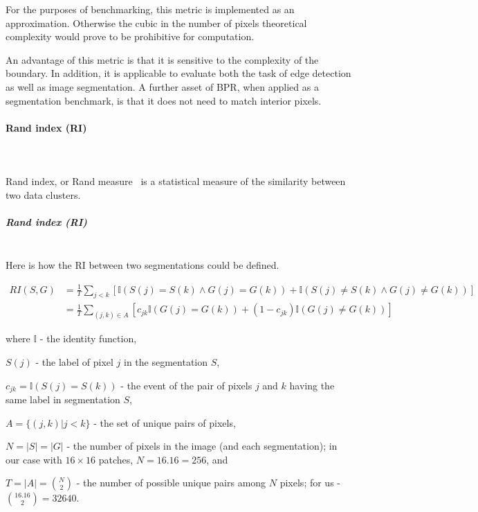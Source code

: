 For the purposes of benchmarking, this metric is implemented as an approximation. Otherwise the cubic in the number of pixels %
theoretical complexity would prove to be prohibitive for computation.

An advantage of this  metric is that it is sensitive to the complexity of the boundary. In addition, it is applicable to evaluate both the task of edge detection as well as image segmentation. A further asset of BPR, when applied as a segmentation benchmark, is that it does not need to match interior pixels.

\paragraph{Rand index (RI)}\mbox{}\\\mbox{}\\
Rand index, or Rand measure~\cite{rand1971objective} is a statistical measure of the similarity between two data clusters.

\subparagraph{Rand index (RI)}\mbox{}\\
\label{par:ch4-RI-maths}
Here is how the RI between two segmentations could be defined.

\begin{align*}
RI(S,G) & =\frac{1}{T}\sum\limits _{j<k}\left[\mathbb{I}\left(S(j)=S(k)\wedge G(j)=G(k)\right)+\mathbb{I}\left(S(j)\neq S(k)\wedge G(j)\neq G(k)\right)\right]\\
 & =\frac{1}{T}\sum\limits _{(j,k)\in A}\left[c_{jk}\mathbb{I}\left(G(j)=G(k)\right)+(1-c_{jk})\mathbb{I}\left(G(j)\neq G(k)\right)\right]
\end{align*}

where $\mathbb{I}$ - the identity function,

$S(j)$ - the label of pixel $j$ in the segmentation $S$,

$c_{jk}=\mathbb{I}\left(S(j)=S(k)\right)$ - the event of the pair
of pixels $j$ and $k$ having the same label in segmentation $S$,

$A=\{(j,k)|j<k\}$ - the set of unique pairs of pixels,

$N=\left|S\right|=\left|G\right|$ - the number of pixels in the image
(and each segmentation); in our case with $16\times 16$ patches, $N=16 . 16 = 256$, and 

$T=|A|=\binom{N}{2}$ - the number of possible unique pairs among
$N$ pixels; for us - $\binom{16 . 16}{2}=32 640$.


